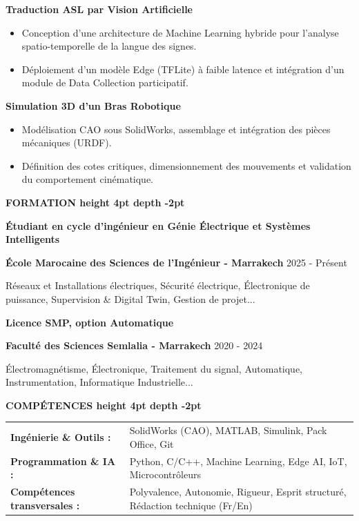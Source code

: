 \documentclass[10pt,a4paper]{altacv}
\renewcommand{\cvsection}[2][]{%
  \medskip%
  {\color{heading}\LARGE\bfseries #2 \hspace{0.2em}\leaders\vrule height 4pt depth -2pt\hfill\mbox{}}\par\smallskip
}
\renewcommand{\cvevent}[4]{%
  {\large\bfseries\color{accent}#1\par}
  \smallskip\normalsize
  \ifstrequal{#2}{}{}{%
    \textbf{\color{emphasis}#2\ifstrequal{#4}{}{}{ - #4}}%
  }%
  \hfill
  \ifstrequal{#3}{}{}{{\small#3}}%
  \par\smallskip
}
\begin{document}
{\large\bfseries\color{accent} Traduction ASL par Vision Artificielle}\\[0.05cm]
\begin{itemize}
  \item Conception d'une architecture de Machine Learning hybride pour l'analyse spatio-temporelle de la langue des signes.
  \item Déploiement d'un modèle Edge (TFLite) à faible latence et intégration d'un module de Data Collection participatif.
\end{itemize}

{\large\bfseries\color{accent} Simulation 3D d'un Bras Robotique}\\[0.05cm]
\begin{itemize}
  \item Modélisation CAO sous SolidWorks, assemblage et intégration des pièces mécaniques (URDF).
  \item Définition des cotes critiques, dimensionnement des mouvements et validation du comportement cinématique.
\end{itemize}


\cvsection{FORMATION}
\cvevent{Étudiant en cycle d'ingénieur en Génie Électrique et Systèmes Intelligents}{École Marocaine des Sciences de l'Ingénieur}{2025 - Présent}{Marrakech}
\small Réseaux et Installations électriques, Sécurité électrique, Électronique de puissance, Supervision \& Digital Twin, Gestion de projet...

\cvevent{Licence SMP, option Automatique}{Faculté des Sciences Semlalia}{2020 - 2024}{Marrakech}
\small Électromagnétisme, Électronique, Traitement du signal, Automatique, Instrumentation, Informatique Industrielle...

\cvsection{COMPÉTENCES}
\begin{tabular}{@{}ll@{}}
\textbf{Ingénierie \& Outils :} & SolidWorks (CAO), MATLAB, Simulink, Pack Office, Git \\[2pt]
\textbf{Programmation \& IA :} & Python, C/C++, Machine Learning, Edge AI, IoT, Microcontrôleurs \\[2pt]
\textbf{Compétences transversales :} & Polyvalence, Autonomie, Rigueur, Esprit structuré, Rédaction technique (Fr/En) \\
\end{tabular}
\end{document}
